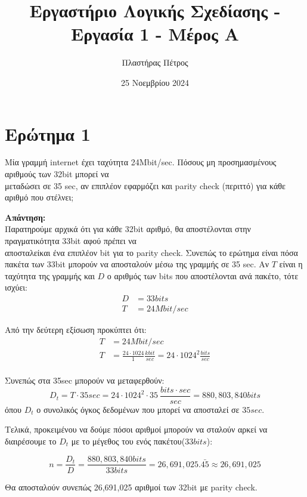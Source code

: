 \documentclass[]{article}
\begin{document}
\author{Πλαστήρας Πέτρος}
\title{Εργαστήριο Λογικής Σχεδίασης - Εργασία 1 - Μέρος Α}
\date{25 Νοεμβρίου 2024}
\maketitle

\section{Ερώτημα 1}
Μία γραμμή internet έχει ταχύτητα 24Mbit/sec.
Πόσους μη προσημασμένους αριθμούς των 32bit μπορεί να \\ μεταδώσει σε 35 sec,
αν επιπλέον εφαρμόζει και parity check (περιττό) για κάθε αριθμό που στέλνει;

\textbf{Απάντηση: }\\
Παρατηρούμε αρχικά ότι για κάθε 32bit αριθμό, θα αποστέλονται στην πραγματικότητα 33bit αφού πρέπει να \\
αποσταλείκαι ένα επιπλέον bit για το parity check. Συνεπώς το ερώτημα είναι πόσα πακέτα των 33bit μπορούν να αποσταλούν μέσω της γραμμής σε 35 sec.
Αν $T$ είναι η ταχύτητα της γραμμής και $D$ ο αριθμός των bits που αποστέλονται ανά πακέτο, τότε ισχύει:
\begin{align*}
	D & = 33bits     \\
	T & = 24Mbit/sec
\end{align*}

Από την δεύτερη εξίσωση προκύπτει ότι:
\begin{align*}
	T & = 24Mbit/sec                                                                  \\
	T & = \frac{24 \cdot 1024}{1} \frac{kbit}{sec} = 24 \cdot 1024^2 \frac{bits}{sec} \\
\end{align*}

Συνεπώς στα 35sec μπορούν να μεταφερθούν:
$$
	D_t = T \cdot 35sec = 24 \cdot 1024^2 \cdot 35 \ \frac{bits \cdot sec}{sec} = 880,803,840 bits
$$
όπου $D_t$ ο συνολικός όγκος δεδομένων που μπορεί να αποσταλεί σε $35sec$.

Τελικά, προκειμένου να δούμε πόσοι αριθμοί μπορούν να σταλούν αρκεί να
διαιρέσουμε το $D_t$ με το μέγεθος του ενός πακέτου($33bits$):

$$
	n = \frac{D_t}{D} = \frac{880,803,840 bits}{33 bits} = 26,691,025.\bar{45} \approx 26,691,025
$$

Θα αποσταλούν συνεπώς 26,691,025 αριθμοί των 32bit με parity check.
\end{document}
